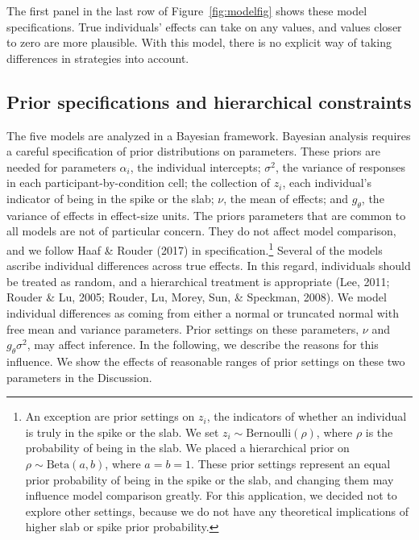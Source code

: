 \documentclass[english,man]{apa6}
\theoremstyle{definition}
\theoremstyle{definition}
\theoremstyle{remark}
\begin{document}
The first panel in the last row of Figure~\ref{fig:modelfig} shows these
model specifications. True individuals' effects can take on any values,
and values closer to zero are more plausible. With this model, there is
no explicit way of taking differences in strategies into account.

\subsection{Prior specifications and hierarchical
constraints}\label{prior-specifications-and-hierarchical-constraints}

The five models are analyzed in a Bayesian framework. Bayesian analysis
requires a careful specification of prior distributions on parameters.
These priors are needed for parameters \(\alpha_i\), the individual
intercepts; \(\sigma^2\), the variance of responses in each
participant-by-condition cell; the collection of \(z_i\), each
individual's indicator of being in the spike or the slab; \(\nu\), the
mean of effects; and \(g_\theta\), the variance of effects in
effect-size units. The priors parameters that are common to all models
are not of particular concern. They do not affect model comparison, and
we follow Haaf \& Rouder (2017) in specification.\footnote{An exception
  are prior settings on \(z_i\), the indicators of whether an individual
  is truly in the spike or the slab. We set
  \(z_i \sim \mbox{Bernoulli}(\rho)\), where \(\rho\) is the probability
  of being in the slab. We placed a hierarchical prior on
  \(\rho \sim \mbox{Beta}(a, b)\), where \(a = b = 1\). These prior
  settings represent an equal prior probability of being in the spike or
  the slab, and changing them may influence model comparison greatly.
  For this application, we decided not to explore other settings,
  because we do not have any theoretical implications of higher slab or
  spike prior probability.} Several of the models ascribe individual
differences across true effects. In this regard, individuals should be
treated as random, and a hierarchical treatment is appropriate (Lee,
2011; Rouder \& Lu, 2005; Rouder, Lu, Morey, Sun, \& Speckman, 2008). We
model individual differences as coming from either a normal or truncated
normal with free mean and variance parameters. Prior settings on these
parameters, \(\nu\) and \(g_\theta \sigma^2\), may affect inference. In
the following, we describe the reasons for this influence. We show the
effects of reasonable ranges of prior settings on these two parameters
in the Discussion.
\end{document}
